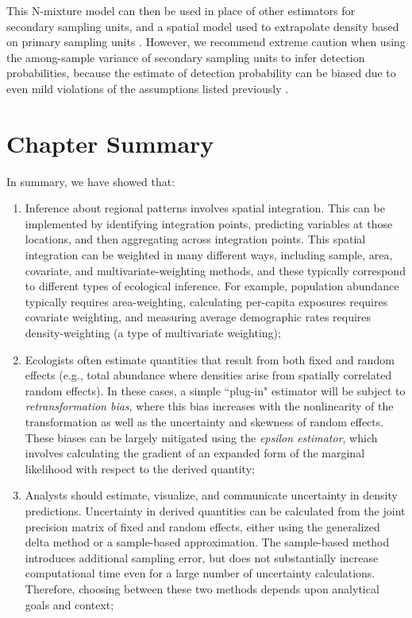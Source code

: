 This N-mixture model \cite{royle_n-mixture_2004} can then be used in place of other estimators for secondary sampling units, and a spatial model used to extrapolate density based on primary sampling units \cite{goldstein_comparing_2022,thorson_demographic_2014}.  However, we recommend extreme caution when using the among-sample variance of secondary sampling units to infer detection probabilities, because the estimate of detection probability can be biased due to even mild violations of the assumptions listed previously \cite{rota_occupancy_2009}.  

\section{Chapter Summary}

In summary, we have showed that:
\begin{enumerate}
    \item Inference about regional patterns involves spatial integration.  This can be implemented by identifying integration points, predicting variables at those locations, and then aggregating across integration points.  This spatial integration can be weighted in many different ways, including sample, area, covariate, and multivariate-weighting methods, and these typically correspond to different types of ecological inference.  For example, population abundance typically requires area-weighting, calculating per-capita exposures requires covariate weighting, and measuring average demographic rates requires density-weighting (a type of multivariate weighting);

    \item Ecologists often estimate quantities that result from both fixed and random effects (e.g., total abundance where densities arise from spatially correlated random effects).  In these cases, a simple ``plug-in" estimator will be subject to \textit{retransformation bias}, where this bias increases with the nonlinearity of the transformation as well as the uncertainty and skewness of random effects.  These biases can be largely mitigated using the \textit{epsilon estimator}, which involves calculating the gradient of an expanded form of the marginal likelihood with respect to the derived quantity;  

    \item Analysts should estimate, visualize, and communicate uncertainty in density predictions.  Uncertainty in derived quantities can be calculated from the joint precision matrix of fixed and random effects, either using the generalized delta method or a sample-based approximation.  The sample-based method introduces additional sampling error, but does not substantially increase computational time even for a large number of uncertainty calculations.  Therefore, choosing between these two methods depends upon analytical goals and context;  


\end{enumerate}
